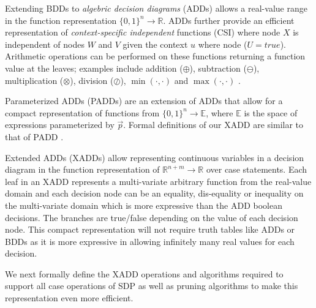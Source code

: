 \documentclass[twoside,11pt]{article}
\begin{document}
Extending BDDs to \emph{algebric decision diagrams} (ADDs) allows a real-value range in the function representation $\lbrace 0,1\rbrace^n \rightarrow \mathbb{R}$. ADDs further provide an efficient representation of \emph{context-specific independent} \cite{bout96} functions (CSI) where node $X$ is independent of nodes $W$ and $V$ given the context $u$ where node ($U=true$). Arithmetic operations can be performed on these functions returning a function value at the leaves; examples include addition
($\oplus$), subtraction ($\ominus$), multiplication ($\otimes$),
division ($\oslash$), $\min(\cdot,\cdot)$ and $\max(\cdot,\cdot)$ \cite{bahar93add}. 

Parameterized ADDs (PADDs) are an extension of ADDs that allow
for a compact representation of functions from $\{0,1\}^{n} \rightarrow
\mathbb{E}$, where $\mathbb{E}$ is the space of expressions
parameterized by $\vec{p}$. Formal definitions of our XADD are similar to that of PADD \cite{spuddip}.

Extended ADDs (XADDs) allow representing continuous variables in a decision diagram in the function representation of $\mathbb{R}^{n+m} \rightarrow \mathbb{R}$ over case statements. Each leaf in an XADD represents a multi-variate arbitrary function from the real-value domain and each decision node can be an equality, dis-equality or inequality on the multi-variate domain which is more expressive than the ADD boolean decisions. The branches are true/false depending on the value of each decision node. This compact representation will not require truth tables like ADDs or BDDs as it is more expressive in allowing infinitely many real values for each decision. 

We next formally define the XADD operations and algorithms required to support all case operations of SDP as well as pruning algorithms to make this representation even more efficient. 
\end{document}

